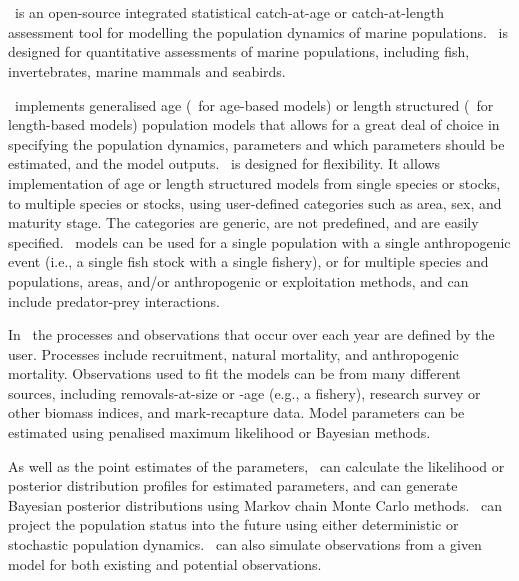 \section{\label{sec:Introduction}}

\subsection{}

\CNAME\ is an open-source integrated statistical catch-at-age or catch-at-length assessment tool for modelling the population dynamics of marine populations. \CNAME\ is designed for quantitative assessments of marine populations, including fish, invertebrates, marine mammals and seabirds.

\CNAME\ implements generalised age (\CNAME\ for age-based models) or length structured (\CNAME\ for length-based models) population models that allows for a great deal of choice in specifying the population dynamics, parameters and which parameters should be estimated, and the model outputs. \CNAME\ is designed for flexibility. It allows implementation of age or length structured models from single species or stocks, to multiple species or stocks, using user-defined categories such as area, sex, and maturity stage. The categories are generic, are not predefined, and are easily specified. \CNAME\ models can be used for a single population with a single anthropogenic event (i.e., a single fish stock with a single fishery), or for multiple species and populations, areas, and/or anthropogenic or exploitation methods, and can include predator-prey interactions.

In \CNAME\ the processes and observations that occur over each year are defined by the user. Processes include recruitment, natural mortality, and anthropogenic mortality. Observations used to fit the models can be from many different sources, including removals-at-size or -age (e.g., a fishery), research survey or other biomass indices, and mark-recapture data. Model parameters can be estimated using penalised maximum likelihood or Bayesian methods.

As well as the point estimates of the parameters, \CNAME\ can calculate the likelihood or posterior distribution profiles for estimated parameters, and can generate Bayesian posterior distributions using Markov chain Monte Carlo methods. \CNAME\ can project the population status into the future using either deterministic or stochastic population dynamics. \CNAME\ can also simulate observations from a given model for both existing and potential observations.

